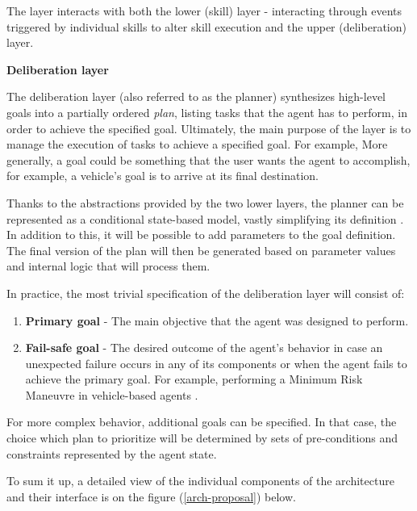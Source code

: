 \documentclass[main.tex]{subfiles}
\begin{document}
The layer interacts with both the lower (skill) layer - interacting through events triggered by
individual skills to alter skill execution and the upper (deliberation) layer. 
 
\textbf{Deliberation layer}

The deliberation layer (also referred to as the planner) synthesizes high-level goals into a
partially ordered \emph{plan}, listing tasks that the agent has to perform, in order to achieve
the specified goal. Ultimately, the main purpose of the layer is to manage the execution of tasks to
achieve a specified goal. For example,  More generally, a goal could be something that the user
wants the agent to accomplish, for example, a vehicle's goal is to arrive at its final
destination.

Thanks to the abstractions provided by the two lower layers, the planner can be represented as
a conditional state-based model, vastly simplifying its definition \cite{Bonasso1995}. In
addition to this, it will be possible to add parameters to the goal definition. The final version of the plan 
will then be generated based on parameter values and internal logic that will process them.

In practice, the most trivial specification of the deliberation layer will consist of:

\begin{enumerate}[label=\alph*)]
    \item \textbf{Primary goal} - The main objective that the agent was designed to perform.
    \item \textbf{Fail-safe goal} - The desired outcome of the agent's behavior in case an unexpected 
    failure occurs in any of its components or when the agent fails to achieve the primary goal. 
    For example, performing a Minimum Risk Maneuvre in vehicle-based agents
    \cite{WorkingAutonomous2022}. %
 \end{enumerate}

For more complex behavior, additional goals can be specified. In that case, the choice which 
plan to prioritize will be determined by sets of pre-conditions and constraints represented by
the agent state.

To sum it up, a detailed view of the individual components of the architecture and their
interface is on the figure (\ref{arch-proposal}) below.
\end{document}

